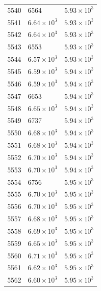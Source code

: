 \begin{table}[H]
\begin{tabular}{lll}
5540 & 6564 & $\displaystyle 5.93 \times 10^{3}$ \\
5541 & $\displaystyle 6.64 \times 10^{3}$ & $\displaystyle 5.93 \times 10^{3}$ \\
5542 & $\displaystyle 6.64 \times 10^{3}$ & $\displaystyle 5.93 \times 10^{3}$ \\
5543 & 6553 & $\displaystyle 5.93 \times 10^{3}$ \\
5544 & $\displaystyle 6.57 \times 10^{3}$ & $\displaystyle 5.93 \times 10^{3}$ \\
5545 & $\displaystyle 6.59 \times 10^{3}$ & $\displaystyle 5.94 \times 10^{3}$ \\
5546 & $\displaystyle 6.59 \times 10^{3}$ & $\displaystyle 5.94 \times 10^{3}$ \\
5547 & 6653 & $\displaystyle 5.94 \times 10^{3}$ \\
5548 & $\displaystyle 6.65 \times 10^{3}$ & $\displaystyle 5.94 \times 10^{3}$ \\
5549 & 6737 & $\displaystyle 5.94 \times 10^{3}$ \\
5550 & $\displaystyle 6.68 \times 10^{3}$ & $\displaystyle 5.94 \times 10^{3}$ \\
5551 & $\displaystyle 6.68 \times 10^{3}$ & $\displaystyle 5.94 \times 10^{3}$ \\
5552 & $\displaystyle 6.70 \times 10^{3}$ & $\displaystyle 5.94 \times 10^{3}$ \\
5553 & $\displaystyle 6.70 \times 10^{3}$ & $\displaystyle 5.94 \times 10^{3}$ \\
5554 & 6756 & $\displaystyle 5.95 \times 10^{3}$ \\
5555 & $\displaystyle 6.70 \times 10^{3}$ & $\displaystyle 5.95 \times 10^{3}$ \\
5556 & $\displaystyle 6.70 \times 10^{3}$ & $\displaystyle 5.95 \times 10^{3}$ \\
5557 & $\displaystyle 6.68 \times 10^{3}$ & $\displaystyle 5.95 \times 10^{3}$ \\
5558 & $\displaystyle 6.69 \times 10^{3}$ & $\displaystyle 5.95 \times 10^{3}$ \\
5559 & $\displaystyle 6.65 \times 10^{3}$ & $\displaystyle 5.95 \times 10^{3}$ \\
5560 & $\displaystyle 6.71 \times 10^{3}$ & $\displaystyle 5.95 \times 10^{3}$ \\
5561 & $\displaystyle 6.62 \times 10^{3}$ & $\displaystyle 5.95 \times 10^{3}$ \\
5562 & $\displaystyle 6.60 \times 10^{3}$ & $\displaystyle 5.95 \times 10^{3}$ \\

\end{tabular}
\end{table}
